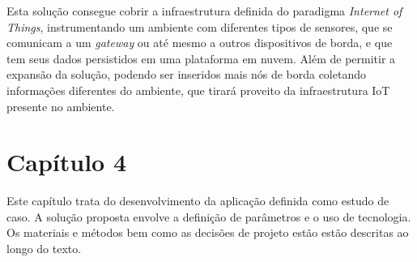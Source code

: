 \documentclass[
    hidelinks,
	12pt,				%
	openany,
	oneside, 
	a4paper,			%
	english,			%
	french,				%
	spanish,			%
	brazil				%
	]{abntex2}
\begin{document}
Esta solução consegue cobrir a infraestrutura definida do paradigma \textit{Internet of Things}, instrumentando um ambiente com diferentes tipos de sensores, que se comunicam a um \textit{gateway} ou até mesmo a outros dispositivos de borda, e que tem seus dados persistidos em uma plataforma em nuvem. Além de permitir a expansão da solução, podendo ser inseridos mais nós de borda coletando informações diferentes do ambiente, que tirará proveito da infraestrutura IoT presente no ambiente.  


\setcounter{section}{0}
\chapter*[Capítulo 4]{Capítulo 4} \label{capitulo4}



Este capítulo trata do desenvolvimento da aplicação definida como estudo de caso. A solução proposta envolve a definição de parâmetros e o uso de tecnologia. Os materiais e métodos bem como as decisões de projeto estão estão descritas ao longo do texto.
\end{document}
